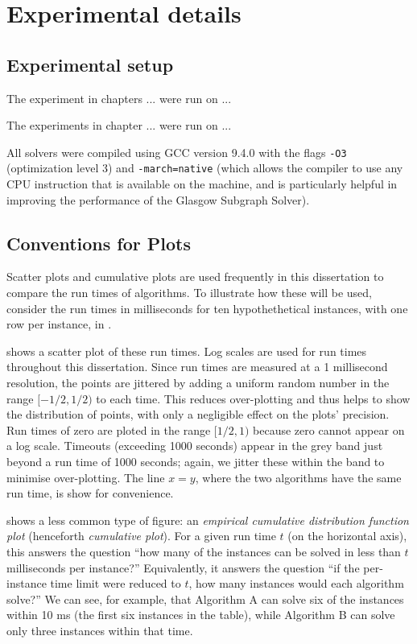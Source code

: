 \section{Experimental details}\label{sec:experimental-details}

\subsection{Experimental setup}

The experiment in chapters ... were run on ...

The experiments in chapter ... were run on ...

All solvers were compiled using GCC version 9.4.0 with the flags
\texttt{-O3} (optimization level 3) and \texttt{-march=native}
(which allows the compiler to use any CPU instruction that is available
on the machine, and is particularly helpful in improving the performance
of the Glasgow Subgraph Solver).

\subsection{Conventions for Plots}

Scatter plots and cumulative plots are used frequently in this dissertation to
compare the run times of algorithms.  To illustrate how these will be used,
consider the run times in milliseconds for ten hypothethetical instances,
with one row per instance, in .

 shows a scatter plot of these run times. Log
scales are used for run times throughout this dissertation. Since run times are
measured at a 1 millisecond resolution, the points are jittered by adding a
uniform random number in the range $[-1/2,1/2)$ to each time. This reduces
over-plotting and thus helps to show the distribution of points, with only a
negligible effect on the plots' precision. Run times of zero are ploted in the
range $[1/2,1)$ because zero cannot appear on a log scale.  Timeouts (exceeding
1000 seconds) appear in the grey band just beyond a run time of 1000 seconds;
again, we jitter these within the band to minimise over-plotting. The line
$x=y$, where the two algorithms have the same run time, is show for
convenience.

 shows a less common type of figure: an
\emph{empirical cumulative distribution function plot} (henceforth
\emph{cumulative plot}). For a given run time $t$ (on the horizontal axis),
this answers the question ``how many of the instances can be solved in less
than $t$ milliseconds per instance?'' Equivalently, it answers the question
``if the per-instance time limit were reduced to $t$, how many instances would
each algorithm solve?''
We can see, for example, that Algorithm A can solve six
of the instances within 10 ms (the first six instances in the table),
while Algorithm B can solve only three instances
within that time.

